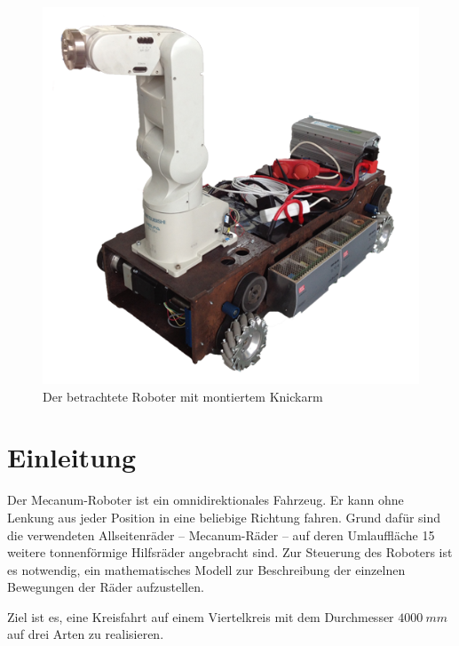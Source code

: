 \begin{figure}
    \centering
    \includegraphics[width=.9\textwidth]{Abbildungen/Roboter}
    \caption{Der betrachtete Roboter mit montiertem Knickarm}
\end{figure}
\newpage

\section{Einleitung}
Der Mecanum-Roboter ist ein omnidirektionales Fahrzeug. Er kann ohne Lenkung aus jeder Position in eine beliebige Richtung fahren. Grund dafür sind die verwendeten Allseitenräder -- Mecanum-Räder -- auf deren Umlauffläche 15 weitere tonnenförmige Hilfsräder angebracht sind. Zur Steuerung des Roboters ist es notwendig, ein mathematisches Modell zur Beschreibung der einzelnen Bewegungen der Räder aufzustellen.

Ziel ist es, eine Kreisfahrt auf einem Viertelkreis mit dem Durchmesser $4000~mm$ auf drei Arten zu realisieren.

